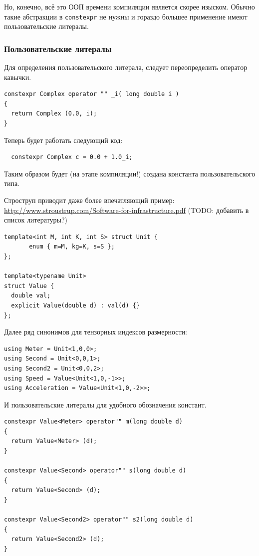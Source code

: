 \documentclass[a4paper,12pt,oneside]{article}
\begin{document}
Но, конечно, всё это ООП времени компиляции является скорее изыском. Обычно такие абстракции в \lstinline!constexpr! не нужны и гораздо большее применение имеют пользовательские литералы.

\subsubsection{Пользовательские литералы}\label{Constexpr:userliterals}

Для определения пользовательского литерала, следует переопределить оператор кавычки.

\begin{lstlisting}
constexpr Complex operator "" _i( long double i )
{
  return Complex (0.0, i);
}
\end{lstlisting}

Теперь будет работать следующий код:

\begin{lstlisting}
  constexpr Complex c = 0.0 + 1.0_i;
\end{lstlisting}

Таким образом будет (на этапе компиляции!) создана константа пользовательского типа.

Строструп приводит даже более впечатляющий пример: \url{http://www.stroustrup.com/Software-for-infrastructure.pdf} (TODO: добавить в список литературы?)

\begin{lstlisting}
template<int M, int K, int S> struct Unit {
       enum { m=M, kg=K, s=S };
};

template<typename Unit> 
struct Value {
  double val; 
  explicit Value(double d) : val(d) {}
};
\end{lstlisting}

Далее ряд синонимов для тензорных индексов размерности:

\begin{lstlisting}
using Meter = Unit<1,0,0>;
using Second = Unit<0,0,1>;
using Second2 = Unit<0,0,2>; 
using Speed = Value<Unit<1,0,-1>>; 
using Acceleration = Value<Unit<1,0,-2>>;
\end{lstlisting}

И пользовательские литералы для удобного обозначения констант.

\begin{lstlisting}
constexpr Value<Meter> operator"" m(long double d)
{
  return Value<Meter> (d);
}   

constexpr Value<Second> operator"" s(long double d)
{
  return Value<Second> (d);  
}   

constexpr Value<Second2> operator"" s2(long double d)
{
  return Value<Second2> (d); 
}
\end{lstlisting}
\end{document}
